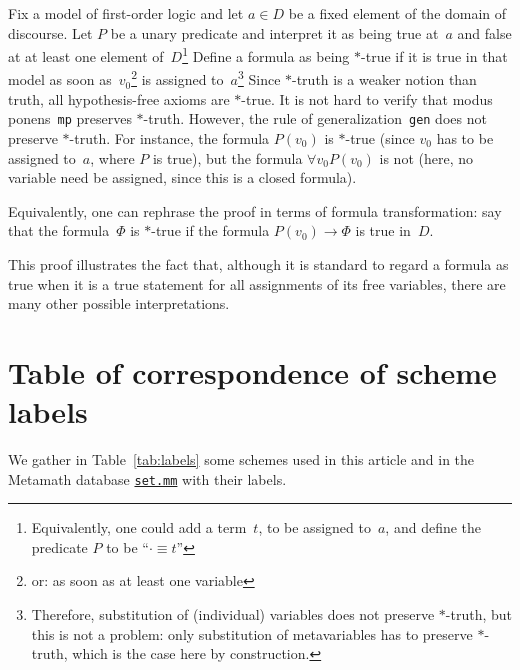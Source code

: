 \documentclass[11pt]{article}
\theoremstyle{plain}
\theoremstyle{definition}
\theoremstyle{remark}
\begin{document}
Fix a model of first-order logic and let $a \in D$ be a fixed element of the domain of discourse.
Let $P$ be a unary predicate and interpret it as being true at~$a$ and false at at least one element
of~$D$\footnote{Equivalently, one could add a term~$t$, to be assigned to~$a$, and define the
predicate $P$ to be ``$\bm{\cdot} \equiv t$''}
Define a formula as being $*$-true if it is true in that model as soon as~$v_0$\footnote{
or: as soon as at least one variable} is assigned to~$a$\footnote{Therefore, substitution of
(individual) variables does not preserve $*$-truth, but this is not a problem: only substitution of
metavariables has to preserve $*$-truth, which is the case here by construction.}
Since $*$-truth is a weaker notion than truth, all hypothesis-free axioms are $*$-true.
It is not hard to verify that modus ponens~\texttt{mp} preserves $*$-truth.
However, the rule of generalization~\texttt{gen} does not preserve $*$-truth.
For instance, the formula $P(v_0)$ is $*$-true (since $v_0$ has to be assigned to~$a$, where $P$ is
true), but the formula $\forall v_0 P(v_0)$ is not (here, no variable need be assigned, since this is
a closed formula).

Equivalently, one can rephrase the proof in terms of formula transformation: say that the
formula~$\Phi$ is $*$-true if the formula $P(v_0) \to \Phi$ is true in~$D$.

This proof illustrates the fact that, although it is standard to regard a formula as true when it is a
true statement for all assignments of its free variables, there are many other possible interpretations.




\section{Table of correspondence of scheme labels}
\label{app:labels}


We gather in Table~\ref{tab:labels} some schemes used in this article and in the Metamath database
\href{https://us.metamath.org/mpeuni/mmset.html}{\texttt{set.mm}} with their labels.
\end{document}
